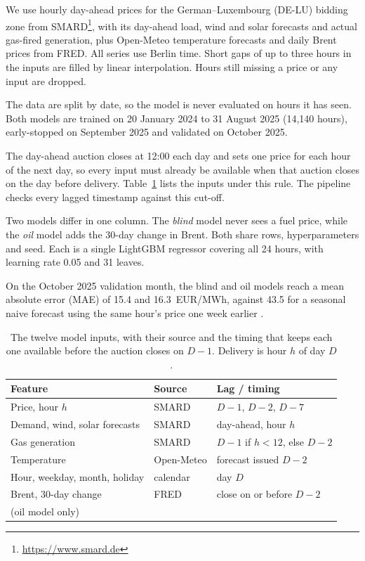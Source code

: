 We use hourly day-ahead prices for the German--Luxembourg (DE-LU) bidding
zone from SMARD\footnote{\url{https://www.smard.de}}, with its day-ahead
load, wind and solar forecasts \cite{trebbien2023} and actual gas-fired
generation, plus Open-Meteo temperature forecasts and daily Brent prices
from FRED. All series use Berlin time. Short gaps of up to three hours in
the inputs are filled by linear interpolation. Hours still missing a price
or any input are dropped.

The data are split by date, so the model is never evaluated on hours it
has seen. Both models are trained on 20 January 2024 to 31 August 2025
(14,140 hours), early-stopped on September 2025 and validated on October
2025.

The day-ahead auction closes at 12:00 each day and sets one price for each
hour of the next day, so every input must already be available when that
auction closes on the day before delivery. Table~\ref{tab:features} lists
the inputs under this rule. The pipeline checks every lagged timestamp against this cut-off.

Two models differ in one column. The \emph{blind} model never sees a fuel
price, while the \emph{oil} model adds the 30-day change in Brent. Both
share rows, hyperparameters and seed. Each is a single LightGBM regressor
\cite{ke2017} covering all 24 hours, with learning rate 0.05 and 31 leaves.

On the October 2025 validation month, the blind and oil models reach a mean absolute error (MAE)
of 15.4 and 16.3~EUR/MWh, against 43.5 for a seasonal naive forecast using
the same hour's price one week earlier \cite{lago2021}.

\begin{table}[b]
  \centering
  \caption{The twelve model inputs, with their source and the timing that
  keeps each one available before the auction closes on $D-1$. Delivery is
  hour $h$ of day $D$.}
  \label{tab:features}
  \footnotesize
  \setlength{\tabcolsep}{4pt}
  \begin{tabular}{@{}lll@{}}
    \hline
    Feature & Source & Lag / timing \\
    \hline
    Price, hour $h$ & SMARD & $D-1$, $D-2$, $D-7$ \\
    Demand, wind, solar forecasts & SMARD & day-ahead, hour $h$ \\
    Gas generation & SMARD & $D-1$ if $h<12$, else $D-2$ \\
    Temperature & Open-Meteo & forecast issued $D-2$ \\
    Hour, weekday, month, holiday & calendar & day $D$ \\
    Brent, 30-day change & FRED & close on or before $D-2$ \\
    \quad(oil model only) & & \\
    \hline
  \end{tabular}
\end{table}